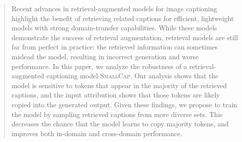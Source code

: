 \begin{abstract}
Recent advances in retrieval-augmented models for image captioning highlight the benefit of retrieving related captions for efficient, lightweight models with strong domain-transfer capabilities. While these models demonstrate the success of retrieval augmentation, retrieval models are still far from perfect in practice:  the retrieved information can sometimes mislead the model, resulting in incorrect generation and worse performance. In this paper, we analyze the robustness of a retrieval-augmented captioning model \textsc{SmallCap}. Our analysis shows that the model is sensitive to tokens that appear in the majority of the retrieved captions, and the input attribution shows that those tokens are likely copied into the generated output. Given these findings, we propose to train the model by sampling retrieved captions from more diverse sets. This decreases the chance that  the model learns to copy majority tokens, and improves both in-domain and cross-domain performance.

\end{abstract}

